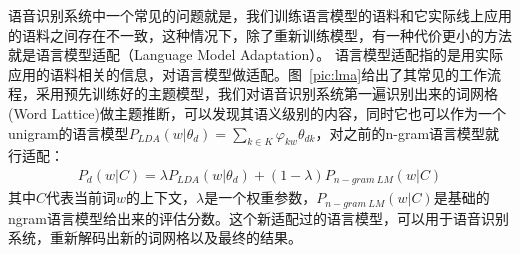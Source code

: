 语音识别系统中一个常见的问题就是，我们训练语言模型的语料和它实际线上应用的语料之间存在不一致，这种情况下，除了重新训练模型，有一种代价更小的方法就是语言模型适配（Language Model Adaptation）。
语言模型适配指的是用实际应用的语料相关的信息，对语言模型做适配。图~\ref{pic:lma}给出了其常见的工作流程，采用预先训练好的主题模型，我们对语音识别系统第一遍识别出来的词网格
(Word Lattice)做主题推断，可以发现其语义级别的内容，同时它也可以作为一个unigram的语言模型$P_{LDA}(w|\theta_d)=\sum_{k \in K} \varphi_{kw} \theta_{dk}$，对之前的n-gram语言模型就行适配：
\begin{equation}
\begin{aligned}
P_{d}(w|C) = \lambda P_{LDA}(w|\theta_d) + (1-\lambda) P_{n-gram \ LM}(w|C)
\end{aligned}
\label{eq:hb_model}
\end{equation}
其中$C$代表当前词$w$的上下文，$\lambda$是一个权重参数，$P_{n-gram\ LM}(w|C)$是基础的ngram语言模型给出来的评估分数。这个新适配过的语言模型，可以用于语音识别系统，重新解码出新的词网格以及最终的结果。
